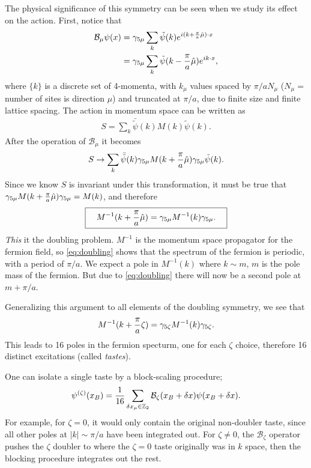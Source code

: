 The physical significance of this symmetry can be seen when we study its effect on the action. First, notice that
\begin{align}
  \mathcal{B}_{\mu} \psi(x) & = \gamma_{5\mu} \sum_k \tilde{\psi}(k) e^{i(k+{\pi\over a}\hat{\mu})\cdot x} \\
  & = \gamma_{5\mu} \sum_k \tilde{\psi}(k-{\pi\over a}\hat{\mu})e^{ik\cdot x},
\end{align}
where $\{k\}$ is a discrete set of 4-momenta, with $k_{\mu}$ values spaced by $\pi/aN_{\mu}$ ($N_{\mu}=$number of sites is direction $\mu$) and truncated at $\pi/a$, due to finite size and finite lattice spacing. The action in momentum space can be written as
\begin{align}
  S = \sum_k \bar{\tilde{\psi}}(k) M(k) \tilde{\psi}(k).
\end{align}
After the operation of $\mathcal{B}_{\mu}$ it becomes
\begin{align}
  S \to \sum_k \bar{\tilde{\psi}}(k) \gamma_{5\mu} M(k+{\pi\over a}\hat{\mu})\gamma_{5\mu} \tilde{\psi}(k).
\end{align}
Since we know $S$ is invariant under this transformation, it must be true that $\gamma_{5\mu} M(k+{\pi\over a}\hat{\mu})\gamma_{5\mu} = M(k)$, and therefore
\begin{align}
  \boxed{  \quad M^{-1}(k+{\pi\over a}\hat{\mu}) = \gamma_{5\mu} M^{-1}(k) \gamma_{5\mu}. \quad}
  \label{eq:doubling}
\end{align}
    {\it{This}} it the doubling problem. $M^{-1}$ is the momentum space propagator for the fermion field, so \eqref{eq:doubling} shows that the spectrum of the fermion is periodic, with a period of $\pi/a$. We expect a pole in $M^{-1}(k)$ where $k \sim m$, $m$ is the pole mass of the fermion. But due to \eqref{eq:doubling} there will now be a second pole at $m + \pi/a$. %

    Generalizing this argument to all elements of the doubling symmetry, we see that
    \begin{align}
      M^{-1}(k+{\pi\over a}\zeta) = \gamma_{5\zeta} M^{-1}(k) \gamma_{5\zeta}.
    \end{align}
    This leads to 16 poles in the fermion specturm, one for each $\zeta$ choice, therefore 16 distinct excitations (called \textit{tastes}).

    One can isolate a single taste by a block-scaling procedure;
    \begin{align}
      \psi^{(\zeta)}(x_B) = {1\over 16} \sum_{\delta x_{\mu} \in \mathbb{Z}_2} \mathcal{B}_{\zeta}(x_B + \delta x) \psi(x_B + \delta x).
      \label{eq:block-scaling}
    \end{align}
    For example, for $\zeta = 0$, it would only contain the original non-doubler taste, since all other poles at $|k|\sim\pi/a$ have been integrated out. For $\zeta \neq 0$, the $\mathcal{B}_{\zeta}$ operator pushes the $\zeta$ doubler to where the $\zeta=0$ taste originally was in $k$ space, then the blocking procedure integrates out the rest.

